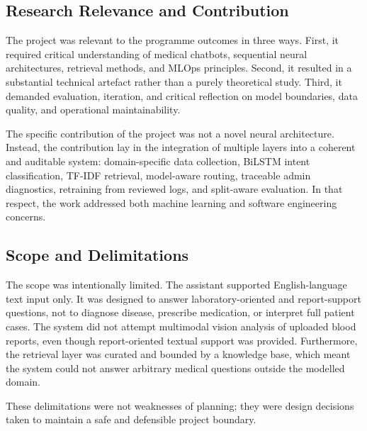\subsection{Research Relevance and Contribution}

The project was relevant to the programme outcomes in three ways. First, it required critical understanding of medical chatbots, sequential neural architectures, retrieval methods, and MLOps principles. Second, it resulted in a substantial technical artefact rather than a purely theoretical study. Third, it demanded evaluation, iteration, and critical reflection on model boundaries, data quality, and operational maintainability.

The specific contribution of the project was not a novel neural architecture. Instead, the contribution lay in the integration of multiple layers into a coherent and auditable system: domain-specific data collection, BiLSTM intent classification, TF-IDF retrieval, model-aware routing, traceable admin diagnostics, retraining from reviewed logs, and split-aware evaluation. In that respect, the work addressed both machine learning and software engineering concerns.

\subsection{Scope and Delimitations}

The scope was intentionally limited. The assistant supported English-language text input only. It was designed to answer laboratory-oriented and report-support questions, not to diagnose disease, prescribe medication, or interpret full patient cases. The system did not attempt multimodal vision analysis of uploaded blood reports, even though report-oriented textual support was provided. Furthermore, the retrieval layer was curated and bounded by a knowledge base, which meant the system could not answer arbitrary medical questions outside the modelled domain.

These delimitations were not weaknesses of planning; they were design decisions taken to maintain a safe and defensible project boundary.
